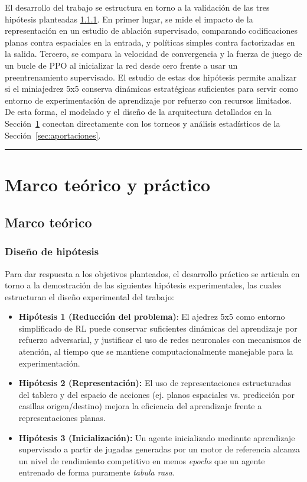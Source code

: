 \documentclass[12pt, a4paper]{article}
\begin{document}
El desarrollo del trabajo se estructura en torno a la validación de las tres hipótesis planteadas \ref{sec:hipotesis}. En primer lugar, se mide el impacto de la representación en un estudio de ablación supervisado, comparando codificaciones planas contra espaciales en la entrada, y políticas simples contra factorizadas en la salida. Tercero, se compara la velocidad de convergencia y la fuerza de juego de un bucle de PPO al inicializar la red desde cero frente a usar un preentrenamiento supervisado. 
El estudio de estas dos hipótesis permite analizar si el miniajedrez 5x5 conserva dinámicas estratégicas suficientes para servir como entorno de experimentación de aprendizaje por refuerzo con recursos limitados. 
De esta forma, el modelado y el diseño de la arquitectura detallados en la Sección~\ref{sec:marco} conectan directamente con los torneos y análisis estadísticos de la Sección~\ref{sec:aportaciones}.

\rule{\textwidth}{0.2pt}
\section{Marco teórico y práctico}\label{sec:marco}

\subsection{Marco teórico}\label{sec:marco_teorico}

\subsubsection{Diseño de hipótesis} \label{sec:hipotesis}

Para dar respuesta a los objetivos planteados, el desarrollo práctico se articula en torno a la demostración de las siguientes hipótesis experimentales, las cuales estructuran el diseño experimental del trabajo:

\begin{itemize}
    \item \textbf{Hipótesis 1 (Reducción del problema)}: El ajedrez 5x5 como entorno simplificado de RL puede conservar suficientes dinámicas del aprendizaje por refuerzo adversarial, y justificar el uso de redes neuronales con mecanismos de atención, al tiempo que se mantiene computacionalmente manejable para la experimentación.
    
    \item \textbf{Hipótesis 2 (Representación):} El uso de representaciones estructuradas del tablero y del espacio de acciones (ej. planos espaciales vs. predicción por casillas origen/destino) mejora la eficiencia del aprendizaje frente a representaciones planas.

    \item \textbf{Hipótesis 3 (Inicialización):} Un agente inicializado mediante aprendizaje supervisado a partir de jugadas generadas por un motor de referencia alcanza un nivel de rendimiento competitivo en menos \textit{epochs} que un agente entrenado de forma puramente \textit{tabula rasa}.
\end{itemize}
\end{document}

